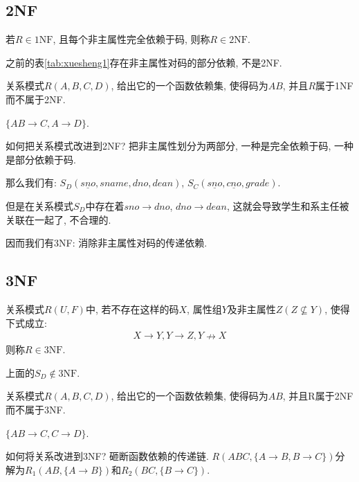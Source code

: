 \subsection{2NF}

\begin{definition}[2NF]
  若$R\in 1\text{NF}$, 且每个非主属性完全依赖于码, 则称$R\in 2\text{NF}$.
\end{definition}

\begin{remark}
  之前的表\ref{tab:xuesheng1}存在非主属性对码的部分依赖, 不是2NF.
\end{remark}

\begin{example}
  关系模式$R(A,B,C,D)$, 给出它的一个函数依赖集, 使得码为$AB$, 并且$R$属于1NF而不属于2NF.

  $\{AB\to C, A\to D\}$.
\end{example}

如何把关系模式改进到2NF? 把非主属性划分为两部分, 一种是完全依赖于码, 一种是部分依赖于码.

那么我们有: $S_D(\underline{sno},sname,dno,dean)$, $S_C(\underline{sno}, \underline{cno}, grade)$.

但是在关系模式$S_D$中存在着$sno\to dno$, $dno \to dean$, 这就会导致学生和系主任被关联在一起了, 不合理的.

因而我们有3NF: 消除非主属性对码的传递依赖.

\subsection{3NF}

\begin{definition}[3NF]
  关系模式$R(U,F)$中, 若不存在这样的码$X$, 属性组$Y$及非主属性$Z(Z\nsubseteq Y)$, 使得下式成立:
  \begin{align*}
      X\to Y, Y\to Z, Y\nrightarrow X
  \end{align*}
  则称$R\in 3\text{NF}$.
\end{definition}

上面的$S_D \notin 3\text{NF}$.

\begin{example}
  关系模式$R(A,B,C,D)$, 给出它的一个函数依赖集, 使得码为$AB$, 并且R属于2NF而不属于3NF.

  $\{AB\to C, C\to D\}$.
\end{example}

如何将关系改进到3NF? 砸断函数依赖的传递链. $R(ABC,\{A\to B,B\to C\})$分解为$R_1(AB,\{A\to B\})$和$R_2(BC,\{B\to C\})$.


